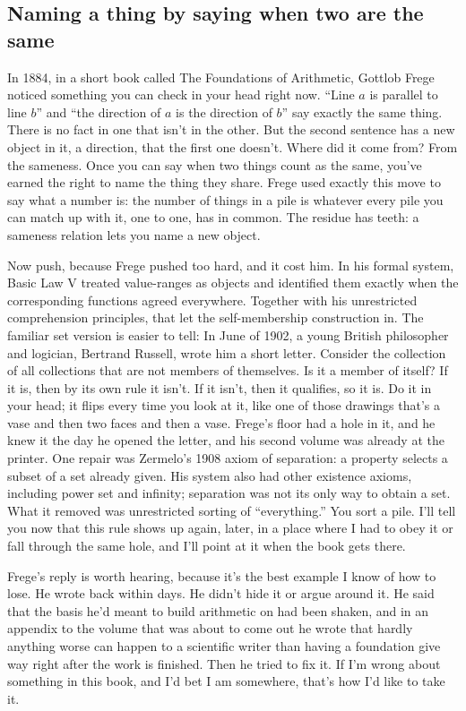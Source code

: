 \documentclass[11pt,twoside]{article}
\theoremstyle{thielethm}
\theoremstyle{thieledef}
\theoremstyle{thieledef}
\theoremstyle{thieledef}
\theoremstyle{thielethm}
\theoremstyle{thieleobs}
\theoremstyle{thielethm}
\begin{document}
\subsection{Naming a thing by saying when two are the same}

In 1884, in a short book called The Foundations of Arithmetic, Gottlob Frege noticed something you can check in your head right now. ``Line $a$ is parallel to line $b$'' and ``the direction of $a$ is the direction of $b$'' say exactly the same thing. There is no fact in one that isn't in the other. But the second sentence has a new object in it, a direction, that the first one doesn't. Where did it come from? From the sameness. Once you can say when two things count as the same, you've earned the right to name the thing they share. Frege used exactly this move to say what a number is: the number of things in a pile is whatever every pile you can match up with it, one to one, has in common. The residue has teeth: a sameness relation lets you name a new object.

Now push, because Frege pushed too hard, and it cost him. In his formal system, Basic Law V treated value-ranges as objects and identified them exactly when the corresponding functions agreed everywhere. Together with his unrestricted comprehension principles, that let the self-membership construction in. The familiar set version is easier to tell: In June of 1902, a young British philosopher and logician, Bertrand Russell, wrote him a short letter. Consider the collection of all collections that are not members of themselves. Is it a member of itself? If it is, then by its own rule it isn't. If it isn't, then it qualifies, so it is. Do it in your head; it flips every time you look at it, like one of those drawings that's a vase and then two faces and then a vase. Frege's floor had a hole in it, and he knew it the day he opened the letter, and his second volume was already at the printer. One repair was Zermelo's 1908 axiom of separation: a property selects a subset of a set already given. His system also had other existence axioms, including power set and infinity; separation was not its only way to obtain a set. What it removed was unrestricted sorting of ``everything.'' You sort a pile. I'll tell you now that this rule shows up again, later, in a place where I had to obey it or fall through the same hole, and I'll point at it when the book gets there.

Frege's reply is worth hearing, because it's the best example I know of how to lose. He wrote back within days. He didn't hide it or argue around it. He said that the basis he'd meant to build arithmetic on had been shaken, and in an appendix to the volume that was about to come out he wrote that hardly anything worse can happen to a scientific writer than having a foundation give way right after the work is finished. Then he tried to fix it. If I'm wrong about something in this book, and I'd bet I am somewhere, that's how I'd like to take it.
\end{document}
